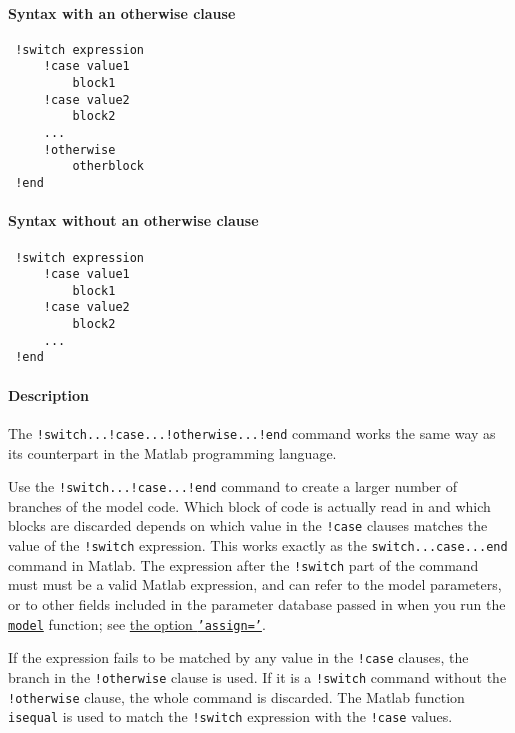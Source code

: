 


	\paragraph{Syntax with an otherwise clause}
 
 \begin{verbatim}
 !switch expression
     !case value1
         block1
     !case value2
         block2
     ...
     !otherwise
         otherblock
 !end
 \end{verbatim}
 
 \paragraph{Syntax without an otherwise clause}
 
 \begin{verbatim}
 !switch expression
     !case value1
         block1
     !case value2
         block2
     ...
 !end
 \end{verbatim}
 
 \paragraph{Description}
 
 The \texttt{!switch...!case...!otherwise...!end} command works the same
 way as its counterpart in the Matlab programming language.
 
 Use the \texttt{!switch...!case...!end} command to create a larger
 number of branches of the model code. Which block of code is actually
 read in and which blocks are discarded depends on which value in the
 \texttt{!case} clauses matches the value of the \texttt{!switch}
 expression. This works exactly as the \texttt{switch...case...end}
 command in Matlab. The expression after the \texttt{!switch} part of the
 command must must be a valid Matlab expression, and can refer to the
 model parameters, or to other fields included in the parameter database
 passed in when you run the \href{model/model}{\texttt{model}} function;
 see \href{model/model}{the option \texttt{'assign='}}.
 
 If the expression fails to be matched by any value in the \texttt{!case}
 clauses, the branch in the \texttt{!otherwise} clause is used. If it is
 a \texttt{!switch} command without the \texttt{!otherwise} clause, the
 whole command is discarded. The Matlab function \texttt{isequal} is used
 to match the \texttt{!switch} expression with the \texttt{!case} values.
 
